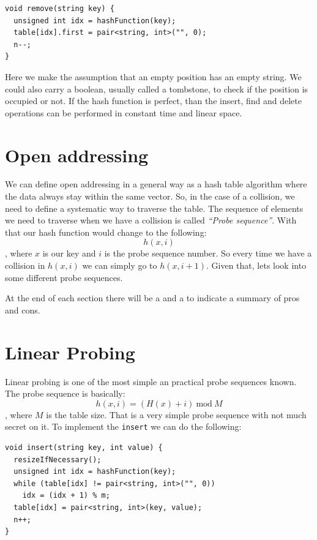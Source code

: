 \begin{lstlisting}
void remove(string key) {
  unsigned int idx = hashFunction(key);
  table[idx].first = pair<string, int>("", 0);
  n--;
}
\end{lstlisting}

Here we make the assumption that an empty position has an empty string. We could also carry a boolean, usually called a tombstone, to check if the position is occupied or not. If the hash function is perfect, than the insert, find and delete operations can be performed in constant time and linear space.

\section{Open addressing}

We can define open addressing in a general way as a hash table algorithm where the data always stay within the same vector. So, in the case of a collision, we need to define a systematic way to traverse the table. The sequence of elements we need to traverse when we have a collision is called \textit{``Probe sequence''}. With that our hash function would change to the following:
\[ h(x, i) \],
where \( x \) is our key and \( i \) is the probe sequence number. So every time we have a collision in \( h(x, i) \) we can simply go to \( h(x, i + 1) \). Given that, lets look into some different probe sequences.

At the end of each section there will be a \rightthumbsup and a \rightthumbsdown to indicate a summary of pros and cons.

\section{Linear Probing}

Linear probing is one of the most simple an practical probe sequences known. The probe sequence is basically:
\[ h(x, i) = (H(x) + i) ~\mathrm{mod}~ M \],
where \( M \) is the table size. That is a very simple probe sequence with not much secret on it. To implement the \texttt{insert} we can do the following:

\begin{lstlisting}
void insert(string key, int value) {
  resizeIfNecessary();
  unsigned int idx = hashFunction(key);
  while (table[idx] != pair<string, int>("", 0))
    idx = (idx + 1) % m;      
  table[idx] = pair<string, int>(key, value);
  n++;
}
\end{lstlisting}

